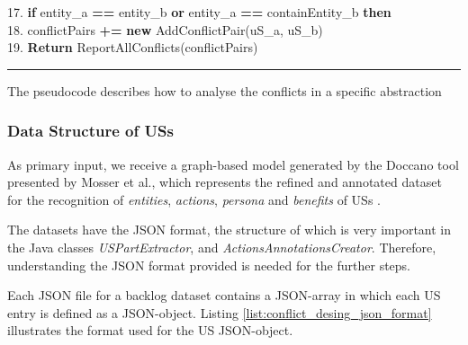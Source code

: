 \begin{MyListing}
\begin{flushleft}
	 17. \hspace{45pt}\textbf{if} entity\_a \textbf{==} entity\_b \textbf{or} entity\_a \textbf{==} containEntity\_b \textbf{then}\\
	 18. \hspace{55pt}conflictPairs \textbf{+=} \textbf{new} AddConflictPair(uS\_a, uS\_b)\\
	 19. \hspace{6pt}\textbf{Return} ReportAllConflicts(conflictPairs)\\
\end{flushleft}
\hrule
\caption{The pseudocode describes how to analyse the conflicts in a specific abstraction}\label{list:conflict_pseudocode}
\end{MyListing}
\subsubsection*{Data Structure of USs}\label{conflict_design_step_0}
As primary input, we receive a graph-based model generated by the Doccano tool presented by Mosser et al., which represents the refined and annotated dataset for the recognition of \emph{entities}, \emph{actions}, \emph{persona} and \emph{benefits} of USs \cite{arulmohan2023extracting}.

The datasets have the JSON format, the structure of which is very important in the Java classes \textit{USPartExtractor}, and \textit{ActionsAnnotationsCreator}. Therefore, understanding the JSON format provided is needed for the further steps.

Each JSON file for a backlog dataset contains a JSON-array in which each US entry is defined as a JSON-object. Listing \ref{list:conflict_desing_json_format} illustrates the format used for the US JSON-object.

